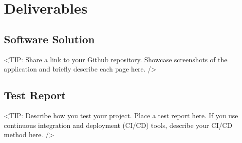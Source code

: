 \chapter{Deliverables}
\label{chap:deliverable}

\section{Software Solution}
\label{section:software-solution}
<TIP: Share a link to your Github repository. Showcase screenshots
of the application and briefly describe each page here. />

\section{Test Report}
\label{section:test-report}
<TIP: Describe how you test your project. Place a test report here.
If you use continuous integration and deployment (CI/CD) tools, describe your
CI/CD method here. />